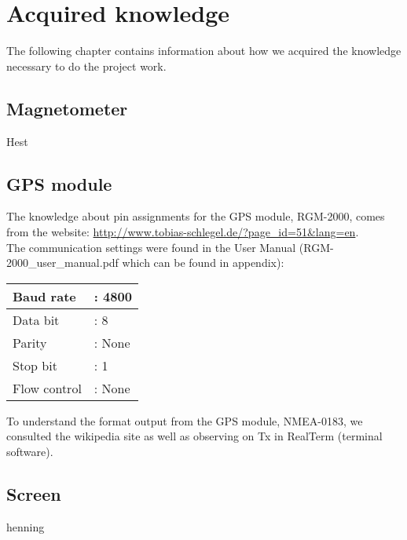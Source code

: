 \chapter{Acquired knowledge}
The following chapter contains information about how we acquired the knowledge necessary to do the project work.\\

\section{Magnetometer}
Hest

\section{GPS module}
The knowledge about pin assignments for the GPS module, RGM-2000, comes from the website: \url{http://www.tobias-schlegel.de/?page_id=51&lang=en}.\\ 
The communication settings were found in the User Manual (RGM-2000\_user\_manual.pdf which can be found in appendix):\\
\begin{table}[H]
    \begin{tabular}{|ll|}
    \hline
    Baud rate    & : 4800 \\ \hline
    Data bit     & : 8    \\ \hline
    Parity       & : None \\ \hline
    Stop bit     & : 1    \\ \hline
    Flow control & : None \\ \hline
    \end{tabular}
\end{table}
To understand the format output from the GPS module, NMEA-0183, we consulted the wikipedia site as well as observing on Tx in RealTerm (terminal software).

\section{Screen}
henning

